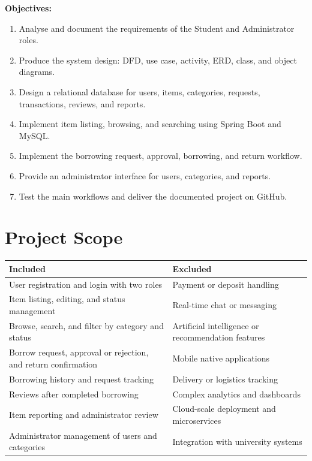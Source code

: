 \documentclass[11pt,a4paper]{article}
\begin{document}
\textbf{Objectives:}
\begin{enumerate}
  \item Analyse and document the requirements of the Student and Administrator roles.
  \item Produce the system design: DFD, use case, activity, ERD, class, and object diagrams.
  \item Design a relational database for users, items, categories, requests, transactions, reviews, and reports.
  \item Implement item listing, browsing, and searching using Spring Boot and MySQL.
  \item Implement the borrowing request, approval, borrowing, and return workflow.
  \item Provide an administrator interface for users, categories, and reports.
  \item Test the main workflows and deliver the documented project on GitHub.
\end{enumerate}

\section{Project Scope}
\begin{tabularx}{\textwidth}{@{}XX@{}}
\toprule
\textbf{Included} & \textbf{Excluded}\\
\midrule
User registration and login with two roles & Payment or deposit handling\\
Item listing, editing, and status management & Real-time chat or messaging\\
Browse, search, and filter by category and status & Artificial intelligence or recommendation features\\
Borrow request, approval or rejection, and return confirmation & Mobile native applications\\
Borrowing history and request tracking & Delivery or logistics tracking\\
Reviews after completed borrowing & Complex analytics and dashboards\\
Item reporting and administrator review & Cloud-scale deployment and microservices\\
Administrator management of users and categories & Integration with university systems\\
\bottomrule
\end{tabularx}

\end{document}
